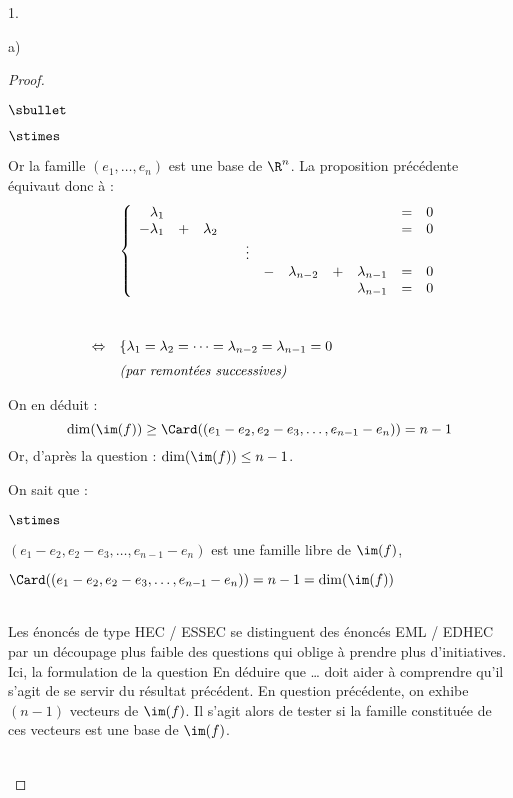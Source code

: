 \documentclass[11pt]{article}%
\begin{document}
\begin{noliste}{1.}
\begin{noliste}{a)}
\begin{proof}
\begin{noliste}{$\sbullet$}
\begin{noliste}{$\stimes$}


      \noindent
      Or la famille $(e_1, \ldots, e_n)$ est une base de $\R^n$. La
      proposition précédente équivaut donc à :
      \[
      \begin{array}{rcl}
       & & \left\{
       \begin{array}{rrrrrrrrrcl}
        \lambda_1 & & & & & & & & & = & 0\\
        -\lambda_1 & + & \lambda_2 & & & & & & & = & 0\\
         & & & & \vdots & & & & & & \\
         & & & & & - & \lambda_{n-2} & + & \lambda_{n-1} & = & 0\\
         & & & & & & & & \lambda_{n-1} & = & 0
       \end{array}
       \right.
       \\[2cm]
       & \Leftrightarrow & 
        \left\{ \lambda_1 = \lambda_2 = \cdots = \lambda_{n-2} = 
        \lambda_{n-1} = 0 \right.
       \\[.2cm]
       & & \mbox{\it (par remontées successives)}
      \end{array}
      \]
     \end{noliste}
         
   \item On en déduit :
      \[
       \dim(\im(f)) \geq \Card((e_1-e_2, e_2-e_3, \ldots, 
       e_{n-1} - e_n)) = n-1
      \]
      Or, d'après la question  : $\dim(\im(f)) \leq n-1$.
      
      \item On sait que :
      \begin{noliste}{$\stimes$}
	\item $(e_1-e_2, e_2-e_3, \ldots, 
	e_{n-1} - e_n)$ est une famille libre de $\im(f)$,
	\item $\Card((e_1-e_2, e_2-e_3, \ldots, 
	e_{n-1} - e_n))=n-1 = \dim(\im(f))$
      \end{noliste}
   \end{noliste}
   \begin{remark}~\\
     Les énoncés de type HEC / ESSEC se distinguent des énoncés EML /
     EDHEC par un découpage plus faible des questions qui oblige à
     prendre plus d'initiatives. Ici, la formulation de la question
     \og En déduire que \ldots \fg{} doit aider à comprendre qu'il
     s'agit de se servir du résultat précédent. En question
     précédente, on exhibe $(n-1)$ vecteurs de $\im(f)$. Il s'agit
     alors de tester si la famille constituée de ces vecteurs est une
     base de $\im(f)$.
   \end{remark}~\\[-1.4cm]
  \end{proof}


\end{noliste}
\end{noliste}
\end{document}
